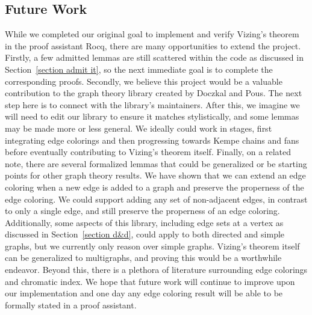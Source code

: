 \subsection{Future Work}
While we completed our original goal to implement and verify Vizing's theorem in the proof assistant Rocq, there are many opportunities to extend the project. Firstly, a few admitted lemmas are still scattered within the code as discussed in Section~\ref{section admit it}, so the next immediate goal is to complete the corresponding proofs. Secondly, we believe this project would be a valuable contribution to the graph theory library created by Doczkal and Pous. The next step here is to connect with the library's maintainers. After this, we imagine we will need to edit our library to ensure it matches stylistically, and some lemmas may be made more or less general. We ideally could work in stages, first integrating edge colorings and then progressing towards Kempe chains and fans before eventually contributing to Vizing's theorem itself. Finally, on a related note, there are several formalized lemmas that could be generalized or be starting points for other graph theory results. We have shown that we can extend an edge coloring when a new edge is added to a graph and preserve the properness of the edge coloring. We could support adding any set of non-adjacent edges, in contrast to only a single edge, and still preserve the properness of an edge coloring. Additionally, some aspects of this library, including edge sets at a vertex as discussed in Section~\ref{section d&d}, could apply to both directed and simple graphs, but we currently only reason over simple graphs. Vizing's theorem itself can be generalized to multigraphs, and proving this would be a worthwhile endeavor. Beyond this, there is a plethora of literature surrounding edge colorings and chromatic index. We hope that future work will continue to improve upon our implementation and one day any edge coloring result will be able to be formally stated in a proof assistant.

\label{conclusion}